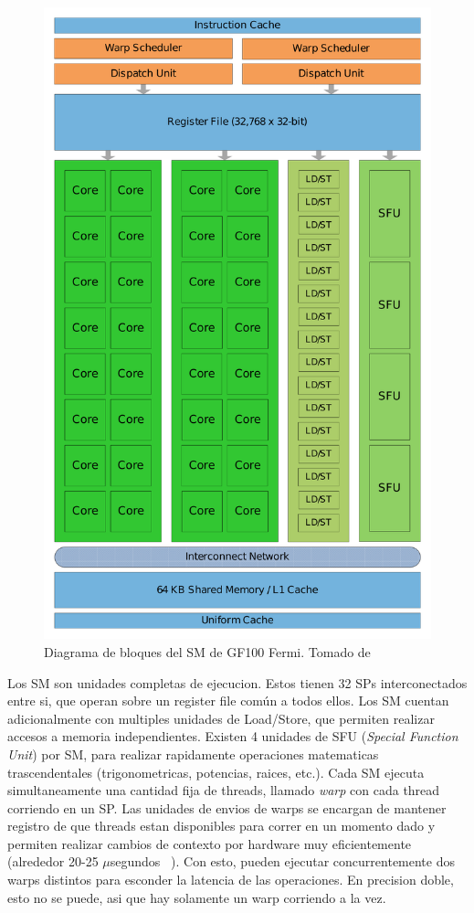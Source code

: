 \begin{figure}[htbp]
    \centering
    \includegraphics[width=\textwidth]{images/fermi-sm.pdf}
    \caption{Diagrama de bloques del SM de GF100 Fermi. Tomado de~\cite{NvidiaFermi}}
    \label{fermi_sm}
\end{figure}

Los SM son unidades completas de ejecucion. Estos tienen 32 SPs interconectados entre si, que operan sobre
un register file com\'un a todos ellos. Los SM cuentan adicionalmente con multiples unidades de Load/Store,
que permiten realizar accesos a memoria independientes. Existen 4 unidades de SFU (\textit{Special Function
Unit}) por SM, para realizar rapidamente operaciones matematicas trascendentales (trigonometricas, potencias,
raices, etc.). Cada SM ejecuta simultaneamente una cantidad fija de threads, llamado \textit{warp}
con cada thread corriendo en un SP. Las unidades de envios de warps se encargan de mantener registro de que
threads estan disponibles para correr en un momento dado y permiten realizar cambios de contexto por hardware
muy eficientemente (alrededor 20-25 $\mu$segundos ~\cite{PattersonFermi}). Con esto, pueden ejecutar
concurrentemente dos warps distintos para esconder la latencia de las operaciones. En precision doble,
esto no se puede, asi que hay solamente un warp corriendo a la vez.

